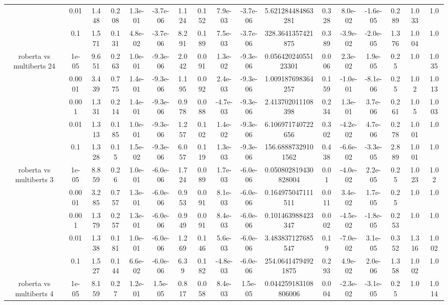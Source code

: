 \begin{tabular}{|c|c|c|c|c|c|c|c|c|c|c|c|c|c|c|c|c|}
 & 0.01 & 1.448 & 0.208 & 1.3e-01 & -3.7e-06 & 1.124 & 0.152 & 7.9e-03 & -3.7e-06 & 5.621284484863281 & 0.328 & 8.0e-02 & -1.6e-05 & 0.289 & 1.033 & 1.0 \\
 & 0.1 & 1.571 & 0.131 & 4.8e-02 & -3.7e-06 & 8.291 & 0.189 & 7.5e-03 & -3.7e-06 & 328.3641357421875 & 0.389 & -3.9e-02 & -2.0e-05 & 1.376 & 1.004 & 1.0 \\
\hline
\multirow{5}{*}{roberta  vs multiberts 24} & 1e-05 & 9.651 & 0.263 & 1.0e-01 & -9.3e-06 & 2.042 & 0.091 & 1.3e-02 & -9.3e-06 & 0.05642024055123301 & 0.006 & 2.3e-02 & 1.9e-05 & 0.25 & 1.0 & 1.035 \\
 & 0.0001 & 3.439 & 0.775 & 1.4e-01 & -9.3e-06 & 1.195 & 0.092 & 2.4e-03 & -9.3e-06 & 1.009187698364257 & 0.159 & -1.0e-01 & -8.1e-06 & 0.25 & 1.02 & 1.013 \\
 & 0.001 & 1.331 & 0.214 & 1.4e-01 & -9.3e-06 & 0.978 & 0.088 & -4.7e-03 & -9.3e-06 & 2.413702011108398 & 0.234 & 1.3e-01 & 3.7e-06 & 0.261 & 1.05 & 1.003 \\
 & 0.01 & 1.313 & 0.185 & 1.0e-01 & -9.3e-06 & 1.257 & 0.102 & 1.4e-02 & -9.3e-06 & 6.106971740722656 & 0.302 & -4.2e-02 & 4.7e-06 & 0.278 & 1.001 & 1.0 \\
 & 0.1 & 1.328 & 0.15 & 1.5e-02 & -9.3e-06 & 6.057 & 0.119 & 1.3e-03 & -9.3e-06 & 156.68887329101562 & 0.438 & -6.6e-02 & -3.3e-05 & 2.889 & 1.001 & 1.0 \\
\hline
\multirow{5}{*}{roberta  vs multiberts 3} & 1e-05 & 8.859 & 0.26 & 1.0e-01 & -6.0e-06 & 1.724 & 0.089 & 1.7e-03 & -6.0e-06 & 0.050802819430828004 & 0.01 & -4.0e-02 & 2.2e-05 & 0.25 & 1.023 & 1.02 \\
 & 0.0001 & 3.285 & 0.757 & 1.3e-01 & -6.0e-06 & 0.953 & 0.091 & 8.1e-03 & -6.0e-06 & 0.164975047111511 & 0.011 & 3.4e-02 & 1.7e-05 & 0.25 & 1.0 & 1.0 \\
 & 0.001 & 1.379 & 0.257 & 1.3e-01 & -6.0e-06 & 0.949 & 0.091 & 8.4e-03 & -6.0e-06 & 0.101463988423347 & 0.002 & -4.5e-02 & -1.8e-05 & 0.253 & 1.0 & 1.0 \\
 & 0.01 & 1.338 & 0.181 & 1.0e-01 & -6.0e-06 & 1.269 & 0.146 & 5.6e-03 & -6.0e-06 & 3.483837127685547 & 0.19 & -7.0e-02 & 3.1e-05 & 0.352 & 1.316 & 1.002 \\
 & 0.1 & 1.527 & 0.144 & 6.6e-02 & -6.0e-06 & 6.39 & 0.182 & -4.8e-03 & -6.0e-06 & 254.06414794921875 & 0.293 & 4.9e-02 & 2.0e-06 & 1.358 & 1.002 & 1.0 \\
\hline
\multirow{5}{*}{roberta  vs multiberts 4} & 1e-05 & 8.159 & 0.27 & 1.2e-01 & 1.5e-05 & 0.817 & 0.058 & 8.4e-03 & 1.5e-05 & 0.044259183108806006 & 0.004 & -2.3e-02 & -3.1e-05 & 0.25 & 1.0 & 1.014 \\

\end{tabular}
